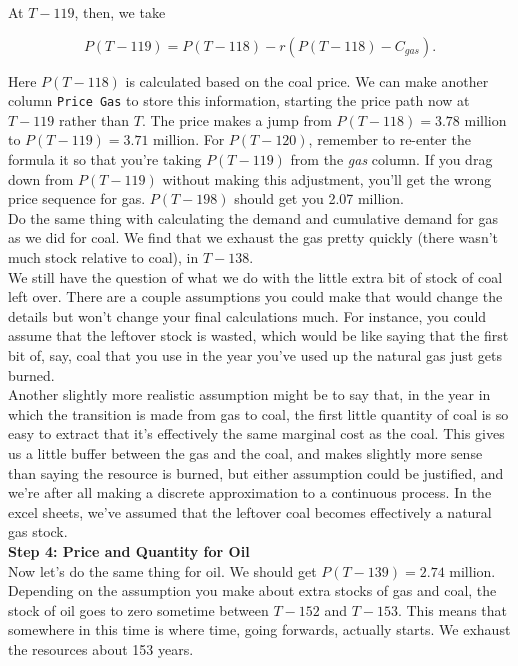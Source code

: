 \begin{enumerate}
\begin{Exercise}
\begin{sol}
        At $T-119$, then, we take
        
        \begin{equation*}
            P(T-119) = P(T-118)-r(P(T-118)-C_{gas}).
        \end{equation*}
        
        Here $P(T-118)$ is calculated based on the coal price. We can make another column \texttt{Price Gas} to store this information, starting the price path now at $T-119$ rather than $T$. The price makes a jump from $P(T-118)=3.78$ million to $P(T-119)=3.71$ million. For $P(T-120)$, remember to re-enter the formula it so that you're taking $P(T-119)$ from the \textit{gas} column. If you drag down from $P(T-119)$ without making this adjustment, you'll get the wrong price sequence for gas. $P(T-198)$ should get you 2.07 million.\\
        
        Do the same thing with calculating the demand and cumulative demand for gas as we did for coal. We find that we exhaust the gas pretty quickly (there wasn't much stock relative to coal), in $T-138$.\\
        
        We still have the question of what we do with the little extra bit of stock of coal left over. There are a couple assumptions you could make that would change the details but won't change your final calculations much. For instance, you could assume that the leftover stock is wasted, which would be like saying that the first bit of, say, coal that you use in the year you've used up the natural gas just gets burned.\\
        
        Another slightly more realistic assumption might be to say that, in the year in which the transition is made from gas to coal, the first little quantity of coal is so easy to extract that it's effectively the same marginal cost as the coal. This gives us a little buffer between the gas and the coal, and makes slightly more sense than saying the resource is burned, but either assumption could be justified, and we're after all making a discrete approximation to a continuous process. In the excel sheets, we've assumed that the leftover coal becomes effectively a natural gas stock.\\
        
        \textbf{Step 4: Price and Quantity for Oil}\\
        
        Now let's do the same thing for oil. We should get $P(T-139)=2.74$ million. Depending on the assumption you make about extra stocks of gas and coal, the stock of oil goes to zero sometime between $T-152$ and $T-153$. This means that somewhere in this time is where time, going forwards, actually starts. We exhaust the resources about 153 years. \\
        

\end{sol}
\end{Exercise}
\end{enumerate}

